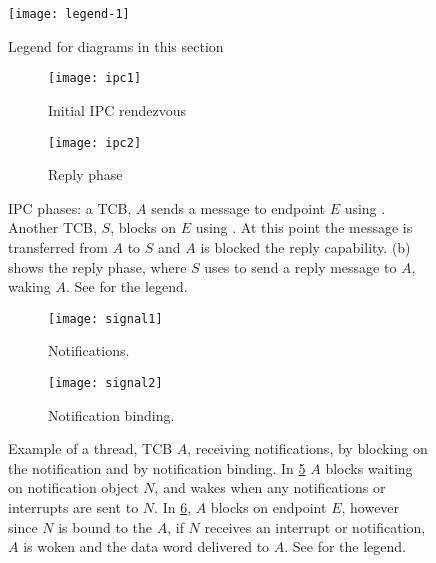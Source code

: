 \begin{figure}
    \centering
    \texttt{[image: legend-1]}
    \caption{Legend for diagrams in this section}
    \label{f:legend-1}
\end{figure}


\begin{figure}
    \centering
    \begin{subfigure}[h]{0.48\textwidth}
        \centering
        \texttt{[image: ipc1]}
        \caption{Initial IPC rendezvous}
        \label{f:ipc1}
    \end{subfigure}%
    \begin{subfigure}[h]{0.48\textwidth}
        \centering
        \texttt{[image: ipc2]}
        \caption{Reply phase}
        \label{f:ipc2}
    \end{subfigure}
    \caption{IPC phases: a TCB, $A$ sends a message to endpoint $E$ using . Another
        TCB, $S$, blocks on $E$ using . At this point the message is transferred from 
        $A$ to $S$ and $A$ is blocked the reply capability. (b) shows the
    reply phase, where $S$ uses  to send a reply message to $A$, waking $A$. See  for the legend.}
    \label{f:ipc}
\end{figure}

\begin{figure}
    \centering
    \begin{subfigure}[h]{0.48\textwidth}
        \centering
        \texttt{[image: signal1]}
        \caption{Notifications.} 
        \label{f:signal1}
    \end{subfigure}%
    \begin{subfigure}[h]{0.48\textwidth}
        \centering
        \texttt{[image: signal2]}
        \caption{Notification binding.}
        \label{f:signal2}
    \end{subfigure}
    \caption{Example of a thread, TCB $A$, receiving notifications, by blocking on the notification and by
        notification binding. In \cref{f:signal1} $A$ blocks waiting on notification
        object $N$, and wakes when any notifications or interrupts are sent to $N$. In
        \cref{f:signal2}, $A$ blocks on endpoint $E$, however since
        $N$ is bound to the $A$, if $N$ receives an interrupt or notification,
        $A$ is woken and the data word delivered to $A$.
        See  for the legend.}
    \label{f:signal}
\end{figure}

